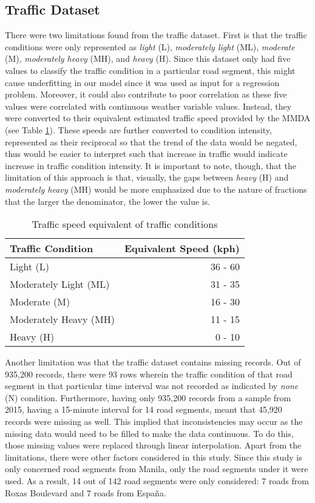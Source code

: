 \subsection{Traffic Dataset}
There were two limitations found from the traffic dataset. First is that the traffic conditions were only represented as \textit{light} (L), \textit{moderately light} (ML), \textit{moderate} (M), \textit{moderately heavy} (MH), and \textit{heavy} (H). Since this dataset only had five values to classify the traffic condition in a particular road segment, this might cause underfitting in our model since it was used as input for a regression problem. Moreover, it could also contribute to poor correlation as these five values were correlated with continuous weather variable values. Instead, they were converted to their equivalent estimated traffic speed provided by the MMDA (see Table \ref{table_traffic_condition}). These speeds are further converted to condition intensity, represented as their reciprocal so that the trend of the data would be negated, thus would be easier to interpret such that increase in traffic would indicate increase in traffic condition intensity. It is important to note, though, that the limitation of this approach is that, visually, the gaps between \textit{heavy} (H) and \textit{moderately heavy} (MH) would be more emphasized due to the nature of fractions that the larger the denominator, the lower the value is.


\begin{table}[h]
\centering
\caption{Traffic speed equivalent of traffic conditions}
\label{table_traffic_condition}
\begin{tabular}{|l|r|}
\hline
\textbf{Traffic Condition} & \multicolumn{1}{l|}{\textbf{Equivalent Speed (kph)}} \\ \hline
Light (L) & 36 - 60 \\ \hline
Moderately Light (ML) & 31 - 35 \\ \hline
Moderate (M) & 16 - 30 \\ \hline
Moderately Heavy (MH) & 11 - 15 \\ \hline
Heavy (H) & 0 - 10 \\ \hline
\end{tabular}
\end{table}

Another limitation was that the traffic dataset contains missing records. Out of 935,200 records, there were 93 rows wherein the traffic condition of that road segment in that particular time interval was not recorded as indicated by \textit{none} (N) condition. Furthermore, having only 935,200 records from a sample from 2015, having a 15-minute interval for 14 road segments, meant that 45,920 records were missing as well. This implied that inconsistencies may occur as the missing data would need to be filled to make the data continuous. To do this, those missing values were replaced through linear interpolation. 
Apart from the limitations, there were other factors considered in this study. Since this study is only concerned road segments from Manila, only the road segments under it were used. As a result, 14 out of 142 road segments were only considered: 7 roads from Roxas Boulevard and 7 roads from España.

